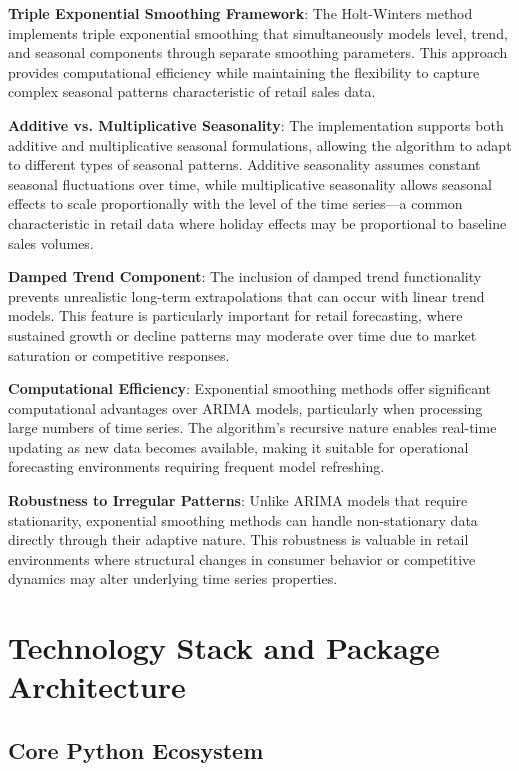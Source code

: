 \textbf{Triple Exponential Smoothing Framework}: The Holt-Winters method implements triple exponential smoothing that simultaneously models level, trend, and seasonal components through separate smoothing parameters. This approach provides computational efficiency while maintaining the flexibility to capture complex seasonal patterns characteristic of retail sales data.

\textbf{Additive vs. Multiplicative Seasonality}: The implementation supports both additive and multiplicative seasonal formulations, allowing the algorithm to adapt to different types of seasonal patterns. Additive seasonality assumes constant seasonal fluctuations over time, while multiplicative seasonality allows seasonal effects to scale proportionally with the level of the time series—a common characteristic in retail data where holiday effects may be proportional to baseline sales volumes.

\textbf{Damped Trend Component}: The inclusion of damped trend functionality prevents unrealistic long-term extrapolations that can occur with linear trend models. This feature is particularly important for retail forecasting, where sustained growth or decline patterns may moderate over time due to market saturation or competitive responses.

\textbf{Computational Efficiency}: Exponential smoothing methods offer significant computational advantages over ARIMA models, particularly when processing large numbers of time series. The algorithm's recursive nature enables real-time updating as new data becomes available, making it suitable for operational forecasting environments requiring frequent model refreshing.

\textbf{Robustness to Irregular Patterns}: Unlike ARIMA models that require stationarity, exponential smoothing methods can handle non-stationary data directly through their adaptive nature. This robustness is valuable in retail environments where structural changes in consumer behavior or competitive dynamics may alter underlying time series properties.

\section{Technology Stack and Package Architecture}

\subsection{Core Python Ecosystem}

